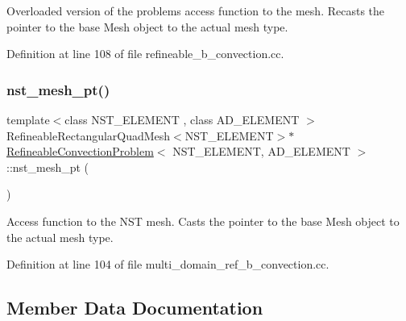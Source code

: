 Overloaded version of the problem\textquotesingle{}s access function to the mesh. Recasts the pointer to the base Mesh object to the actual mesh type. 



Definition at line 108 of file refineable\+\_\+b\+\_\+convection.\+cc.

\mbox{\label{classRefineableConvectionProblem_a9c84adefabe5a9ba08ed946577a19071}} 
\subsubsection{\texorpdfstring{nst\+\_\+mesh\+\_\+pt()}{nst\_mesh\_pt()}}
{\footnotesize\ttfamily template$<$class N\+S\+T\+\_\+\+E\+L\+E\+M\+E\+NT , class A\+D\+\_\+\+E\+L\+E\+M\+E\+NT $>$ \\
Refineable\+Rectangular\+Quad\+Mesh$<$N\+S\+T\+\_\+\+E\+L\+E\+M\+E\+NT$>$$\ast$ \hyperlink{classRefineableConvectionProblem}{Refineable\+Convection\+Problem}$<$ N\+S\+T\+\_\+\+E\+L\+E\+M\+E\+NT, A\+D\+\_\+\+E\+L\+E\+M\+E\+NT $>$\+::nst\+\_\+mesh\+\_\+pt (\begin{DoxyParamCaption}{ }\end{DoxyParamCaption})\hspace{0.3cm}{\ttfamily [inline]}}



Access function to the N\+ST mesh. Casts the pointer to the base Mesh object to the actual mesh type. 



Definition at line 104 of file multi\+\_\+domain\+\_\+ref\+\_\+b\+\_\+convection.\+cc.



\subsection{Member Data Documentation}
\mbox{\label{classRefineableConvectionProblem_abfa55603a761cf57cb7de38beb8fa9ac}} 
